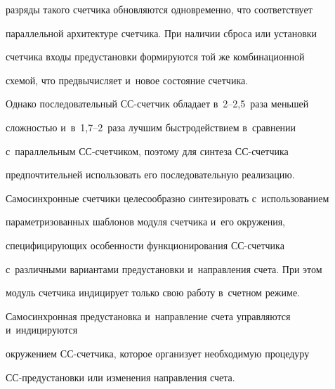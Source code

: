 разряды такого счетчика об\-нов\-ля\-ют\-ся одновременно, что соответствует 

параллельной архитектуре счетчика. При наличии сброса или уста\-нов\-ки 

счетчика входы предуста\-нов\-ки формируются той же комбинационной 

схемой, что пред\-вы\-чис\-ля\-ет и~новое со\-сто\-яние счет\-чика. 

  

  Однако последовательный СС-счетчик обладает в~2--2,5~раза меньшей 

слож\-ностью и~в~1,7--2~раза луч\-шим быст\-ро\-дей\-ст\-ви\-ем в~сравнении 

с~параллельным СС-счет\-чи\-ком, поэтому для синтеза СС-счет\-чи\-ка 

предпочтительней использовать его по\-сле\-до\-ва\-тель\-ную реализацию.

  

  Самосинхронные счетчики целесообразно синтезировать с~использованием 

па\-ра\-мет\-ри\-зо\-ван\-ных шаб\-ло\-нов модуля счетчика и~его окружения, 

спе\-ци\-фи\-ци\-ру\-ющих особенности функционирования СС-счет\-чи\-ка 

с~различными вариантами предуста\-нов\-ки и~на\-прав\-ле\-ния счета. При этом 

модуль счетчика индицирует только свою работу в~счет\-ном режиме.  

Самосинхронная предуста\-нов\-ка и~на\-прав\-ле\-ние счета управ\-ля\-ют\-ся и~индицируются 

окружением СС-счет\-чи\-ка, которое организует необходимую процедуру  

СС-предуста\-нов\-ки или изменения на\-прав\-ле\-ния \mbox{счета.}



